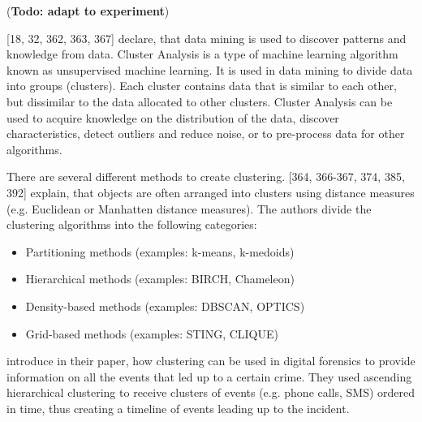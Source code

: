 


(\textbf{Todo: adapt to experiment})

\textcite{han2011data}[18, 32, 362, 363, 367] declare, that data mining is used to discover patterns and knowledge from data.
Cluster Analysis is a type of machine learning algorithm known as unsupervised machine learning. It is used in data mining to divide data into groups (clusters). Each cluster contains data that is similar to each other, but dissimilar to the data allocated to other clusters. Cluster Analysis can be used to acquire knowledge on the distribution of the data, discover characteristics, detect outliers and reduce noise, or to pre-process data for other algorithms. 

There are several different methods to create clustering. \textcite{han2011data}[364, 366-367, 374, 385, 392] explain, that objects are often arranged into clusters using distance measures (e.g. Euclidean or Manhatten distance measures). 
The authors divide the clustering algorithms into the following categories:
\begin{itemize}
	\item Partitioning methods (examples: k-means, k-medoids)
	\item Hierarchical methods (examples: BIRCH, Chameleon)
	\item Density-based methods (examples: DBSCAN, OPTICS)
	\item Grid-based methods (examples: STING, CLIQUE)
\end{itemize}




\textcite{forensics} introduce in their paper, how clustering can be used in digital forensics to provide information on all the events that led up to a certain crime. They used ascending hierarchical clustering to receive clusters of events (e.g. phone calls, SMS) ordered in time, thus creating a timeline of events leading up to the incident.

